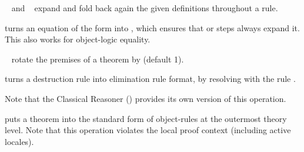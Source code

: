 \begin{isabellebody}
\begin{isamarkuptext}
\begin{description}
  \item \hyperlink{attribute.unfolded}{\mbox{}}~ and \hyperlink{attribute.folded}{\mbox{}}~ expand and fold back again the given
  definitions throughout a rule.

  \item \hyperlink{attribute.abs-def}{\mbox{}} turns an equation of the form  into , which ensures that \hyperlink{method.simp}{\mbox{}} or \hyperlink{method.unfold}{\mbox{}} steps always expand it.  This also works
  for object-logic equality.

  \item \hyperlink{attribute.rotated}{\mbox{}}~ rotate the premises of a
  theorem by  (default 1).

  \item \hyperlink{attribute.Pure.elim-format}{\mbox{}} turns a destruction rule into
  elimination rule format, by resolving with the rule .
  
  Note that the Classical Reasoner () provides
  its own version of this operation.

  \item \hyperlink{attribute.standard}{\mbox{}} puts a theorem into the standard form of
  object-rules at the outermost theory level.  Note that this
  operation violates the local proof context (including active
  locales).


\end{description}
\end{isamarkuptext}
\end{isabellebody}
